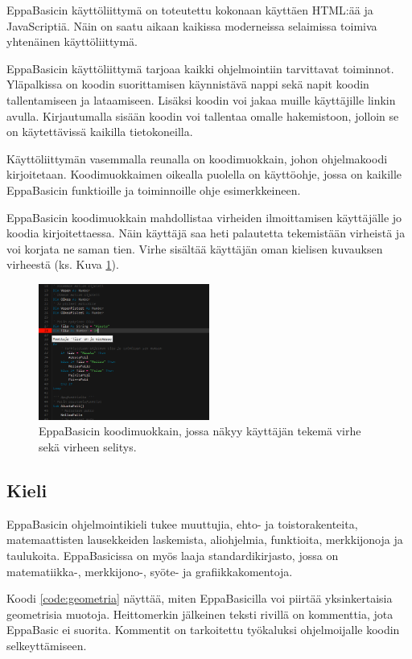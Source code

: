 EppaBasicin käyttöliittymä on toteutettu
kokonaan käyttäen HTML:ää ja JavaScriptiä.
Näin on saatu aikaan kaikissa moderneissa
selaimissa toimiva yhtenäinen käyttöliittymä.

EppaBasicin käyttöliittymä tarjoaa kaikki
ohjelmointiin tarvittavat toiminnot.
Yläpalkissa on koodin suorittamisen käynnistävä
nappi sekä napit koodin tallentamiseen ja lataamiseen.
Lisäksi koodin voi jakaa muille käyttäjille linkin avulla.
Kirjautumalla sisään koodin voi tallentaa
omalle hakemistoon, jolloin se on käytettävissä
kaikilla tietokoneilla.

Käyttöliittymän vasemmalla reunalla on
koodimuokkain, johon
ohjelmakoodi kirjoitetaan.
Koodimuokkaimen oikealla puolella on
käyttöohje, jossa on kaikille
EppaBasicin funktioille
ja toiminnoille ohje esimerkkeineen.

EppaBasicin koodimuokkain mahdollistaa
virheiden ilmoittamisen käyttäjälle jo
koodia kirjoitettaessa.
Näin käyttäjä saa heti palautetta tekemistään
virheistä ja voi korjata ne saman tien.
Virhe sisältää käyttäjän oman
kielisen kuvauksen virheestä
(ks. Kuva \ref{img:virhe}).

\begin{figure}[h]
    \centering
    \includegraphics[width=0.5\textwidth]{virhe}
    \caption{EppaBasicin koodimuokkain, jossa näkyy käyttäjän tekemä virhe sekä virheen selitys.}
    \label{img:virhe}
\end{figure}

\subsection{Kieli}
EppaBasicin ohjelmointikieli tukee
muuttujia,
ehto- ja toistorakenteita,
matemaattisten lausekkeiden laskemista,
aliohjelmia, funktioita,
merkkijonoja ja
taulukoita.
EppaBasicissa on myös
laaja standardikirjasto,
jossa on matematiikka-,
merkkijono-, syöte- ja
grafiikkakomentoja.

Koodi \ref{code:geometria} näyttää,
miten EppaBasicilla voi piirtää
yksinkertaisia geometrisia muotoja.
Heittomerkin  jälkeinen
teksti rivillä on kommenttia,
jota EppaBasic ei suorita.
Kommentit on tarkoitettu
työkaluksi ohjelmoijalle
koodin selkeyttämiseen.

